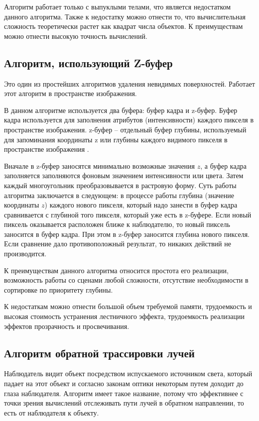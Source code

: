 Алгоритм работает только с выпуклыми телами, что является недостатком данного алгоритма. Также к недостатку можно отнести то, что вычислительная сложность теоретически растет как квадрат числа объектов. К преимуществам можно отнести высокую точность вычислений.

\subsection{Алгоритм, использующий Z-буфер}

Это один из простейших алгоритмов удаления невидимых поверхностей. Работает этот алгоритм в пространстве изображения\cite{info_rodjers}. 

В данном алгоритме используется два буфера: буфер кадра и z-буфер. Буфер кадра используется для заполнения атрибутов (интенсивности) каждого пикселя в пространстве изображения. z-буфер -- отдельный буфер глубины, используемый для запоминания координаты z или глубины каждого видимого пикселя в пространстве изображения \cite{info_rodjers}.

Вначале в z-буфер заносятся минимально возможные значения $z$, а буфер
кадра заполняется заполняются фоновым значением интенсивности или цвета.
Затем каждый многоугольник преобразовывается в растровую форму. 
Суть работы алгоритма заключается в следующем: в процессе работы глубина
(значение координаты $z$) каждого нового пикселя, который надо занести в буфер кадра сравнивается с глубиной того пикселя, который уже есть в z-буфере. 
Если новый пиксель оказывается расположен ближе к наблюдателю, то новый пиксель заносится в буфер кадра. При этом в z-буфер заносится глубина нового пикселя.
Если сравнение дало противоположный результат, то никаких действий не
производится. 

К преимуществам данного алгоритма относится простота его реализации, возможность работы со сценами любой сложности, отсутствие необходимости в сортировке по приоритету глубины.

К недостаткам можно отнести большой объем требуемой памяти, трудоемкость и высокая стоимость устранения лестничного эффекта, трудоемкость реализации эффектов прозрачность и просвечивания.

\subsection{Алгоритм обратной трассировки лучей}

Наблюдатель видит объект посредством испускаемого источником света,
который падает на этот объект и согласно законам оптики некоторым путем
доходит до глаза наблюдателя. Алгоритм имеет такое название, потому что
эффективнее с точки зрения вычислений отслеживать пути лучей в обратном
направлении, то есть от наблюдателя к объекту.

